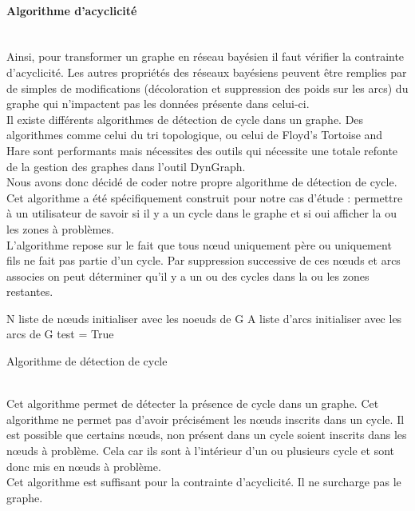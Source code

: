 \documentclass[conference]{IEEEtran}
\begin{document}
\paragraph{Algorithme d'acyclicité} 
\\
Ainsi, pour transformer un graphe en réseau bayésien il faut vérifier la contrainte d'acyclicité. Les autres propriétés des réseaux bayésiens peuvent être remplies par de simples de modifications (décoloration et suppression des poids sur les arcs) du graphe qui n'impactent pas les données présente dans celui-ci. \\
Il existe différents algorithmes de détection de cycle dans un graphe. Des algorithmes comme celui du tri topologique, ou celui de Floyd's Tortoise and Hare sont performants mais nécessites des outils qui nécessite une totale refonte de la gestion des graphes dans l'outil DynGraph. \\
Nous avons donc décidé de coder notre propre algorithme de détection de cycle. Cet algorithme a été spécifiquement construit pour notre cas d'étude : permettre à un utilisateur de savoir si il y a un cycle dans le graphe et si oui afficher la ou les zones à problèmes. \\
L'algorithme repose sur le fait que tous nœud uniquement père ou uniquement fils ne fait pas partie d'un cycle. Par suppression successive de ces nœuds et arcs associes on peut déterminer qu'il y a un ou des cycles dans la ou les zones restantes.  \\

 \begin{algorithm}[H]
 N liste de nœuds initialiser avec les noeuds de G\;
 A liste d'arcs initialiser avec les arcs de G\;
 test = True\;
\caption{Algorithme de détection de cycle}
\end{algorithm}
\\
Cet algorithme permet de détecter la présence de cycle dans un graphe. Cet algorithme ne permet pas d'avoir précisément les nœuds inscrits dans un cycle. Il est possible que certains nœuds, non présent dans un cycle soient inscrits dans les nœuds à problème. Cela car ils sont à l'intérieur d'un ou plusieurs cycle et sont donc mis en nœuds à problème. \\
Cet algorithme est suffisant pour la contrainte d'acyclicité. Il ne surcharge pas le graphe.
\end{document}
